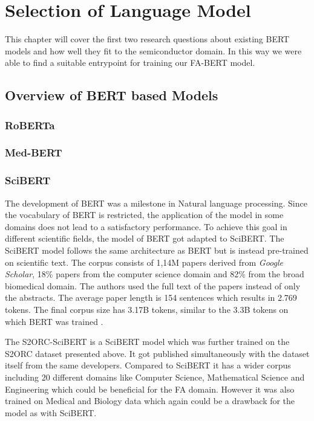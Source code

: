 \chapter{Selection of Language Model} \label{chapter:analysis}
This chapter will cover the first two research questions about existing BERT models and how well they fit to the semiconductor domain. In this way we were able to find a suitable entrypoint for training our FA-BERT model.

\section{Overview of BERT based Models}

\subsection{RoBERTa}

\subsection{Med-BERT}

\subsection{SciBERT}
The development of BERT was a milestone in Natural language processing. Since the vocabulary of BERT is restricted, the application of the model in some domains does not lead to a satisfactory performance. To achieve this goal in different scientific fields, the model of BERT got adapted to SciBERT. The SciBERT model follows the same architecture as BERT but is instead pre-trained on scientific text. The corpus consists of 1,14M papers derived from \textit{Google Scholar}, 18\% papers from the computer science domain and 82\% from the broad biomedical domain. The authors used the full text of the papers instead of only the abstracts. The average paper length is 154 sentences which results in 2.769 tokens. The final corpus size has 3.17B tokens, similar to the 3.3B tokens on which BERT was trained \cite{Beltagy}. \newline

The S2ORC-SciBERT is a SciBERT model which was further trained on the S2ORC dataset presented above. It got published simultaneously with the dataset itself from the same developers. Compared to SciBERT it has a wider corpus including 20 different domains like Computer Science, Mathematical Science and Engineering which could be beneficial for the FA domain. However it was also trained on Medical and Biology data which again could be a drawback for the model as with SciBERT.

